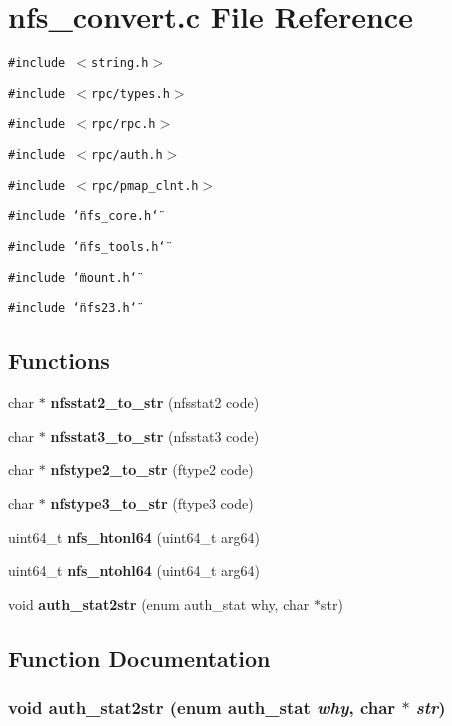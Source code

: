 \section{nfs\_\-convert.c File Reference}
\label{nfs__convert_8c}
{\tt \#include $<$string.h$>$}\par
{\tt \#include $<$rpc/types.h$>$}\par
{\tt \#include $<$rpc/rpc.h$>$}\par
{\tt \#include $<$rpc/auth.h$>$}\par
{\tt \#include $<$rpc/pmap\_\-clnt.h$>$}\par
{\tt \#include \char`\"{}nfs\_\-core.h\char`\"{}}\par
{\tt \#include \char`\"{}nfs\_\-tools.h\char`\"{}}\par
{\tt \#include \char`\"{}mount.h\char`\"{}}\par
{\tt \#include \char`\"{}nfs23.h\char`\"{}}\par
\subsection*{Functions}
\begin{CompactItemize}
\item 
char $\ast$ {\bf nfsstat2\_\-to\_\-str} (nfsstat2 code)
\item 
char $\ast$ {\bf nfsstat3\_\-to\_\-str} (nfsstat3 code)
\item 
char $\ast$ {\bf nfstype2\_\-to\_\-str} (ftype2 code)
\item 
char $\ast$ {\bf nfstype3\_\-to\_\-str} (ftype3 code)
\item 
uint64\_\-t {\bf nfs\_\-htonl64} (uint64\_\-t arg64)
\item 
uint64\_\-t {\bf nfs\_\-ntohl64} (uint64\_\-t arg64)
\item 
void {\bf auth\_\-stat2str} (enum auth\_\-stat why, char $\ast$str)
\end{CompactItemize}


\subsection{Function Documentation}
\subsubsection[{auth\_\-stat2str}]{\setlength{\rightskip}{0pt plus 5cm}void auth\_\-stat2str (enum auth\_\-stat {\em why}, \/  char $\ast$ {\em str})}\label{nfs__convert_8c_5657f2f86e16f34b4a81906b5c828560}



